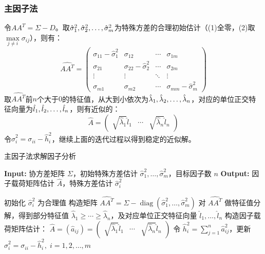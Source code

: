 \subsubsection{主因子法}
\begin{method}
	令$AA^T=\Sigma-D$。取$\hat{\sigma}^2_1, \hat{\sigma}^2_2, \dots, \hat{\sigma}^2_{m}$为特殊方差的合理初始估计（(1)全零，(2)取$\max\limits_{j\ne i}\sigma_{ij}$），则有：
	\begin{equation*}
		\widehat{AA^T}=
		\begin{pmatrix}
			\sigma_{11}-\hat{\sigma}_1^2 & \sigma_{12} & \cdots & \sigma_{1m} \\
			\sigma_{21} & \sigma_{22}-\hat{\sigma}_2^2 & \cdots & \sigma_{2m} \\
			\vdots & \vdots & \ddots & \vdots \\
			\sigma_{m1} & \sigma_{m2} & \cdots & \sigma_{mm}-\hat{\sigma}_m^2
		\end{pmatrix}
	\end{equation*}
	取$\widehat{AA^T}$前$n$个大于$0$的特征值，从大到小依次为$\hat{\lambda}_1, \hat{\lambda}_2, \dots, \hat{\lambda}_{n}$，对应的单位正交特征向量为$\hat{l}_1, \hat{l}_2, \dots, \hat{l}_{n}$，则有近似的：
	\begin{equation*}
		\hat{A}=
		\begin{pmatrix}
			\sqrt{\hat{\lambda}_1}\hat{l}_1 & \cdots & \sqrt{\hat{\lambda}_n}\hat{l}_n
		\end{pmatrix}
	\end{equation*}
	令$\hat{\sigma}_i^2=\sigma_{ii}-\hat{h}_i^2$，继续上面的迭代过程以得到稳定的近似解。
\end{method}
\begin{algorithm}
	\caption{主因子法求解因子分析}
	\begin{algorithmic}[1]
		\State \textbf{Input:} 协方差矩阵 $\Sigma$，初始特殊方差估计 $\hat{\sigma}^2_1, \ldots, \hat{\sigma}^2_m$，目标因子数 $n$
		\State \textbf{Output:} 因子载荷矩阵估计 $\hat{A}$，特殊方差估计 $\hat{\sigma}_i^2$
		
		\State 初始化 $\hat{\sigma}_i^2$ 为合理值
		\Repeat
		\State 构造矩阵 $\widehat{AA^T} = \Sigma - \operatorname{diag}(\hat{\sigma}_1^2, \ldots, \hat{\sigma}_m^2)$
		\State 对 $\widehat{AA^T}$ 做特征值分解，得到部分特征值 $\hat{\lambda}_1 \geqslant \cdots \geqslant \hat{\lambda}_n$，及对应单位正交特征向量 $\hat{l}_1, \ldots, \hat{l}_n$
		\State 构造因子载荷矩阵估计：
		$
		\hat{A}=(\hat{a}_{ij}) = \begin{pmatrix}
			\sqrt{\hat{\lambda}_1} \hat{l}_1 & \cdots & \sqrt{\hat{\lambda}_n} \hat{l}_n
		\end{pmatrix}
		$
		\State 令 $\hat{h}_i^2 = \sum\limits_{j=1}^n \hat{a}_{ij}^2$，更新 $\hat{\sigma}_i^2 = \sigma_{ii} - \hat{h}_i^2,\;i=1,2,\dots,m$
	\end{algorithmic}
\end{algorithm}
